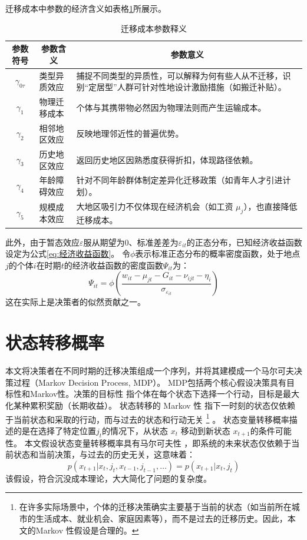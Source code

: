 \documentclass[
  a4paper,
  zihao=-4,
  fontset=mac,
  AutoFakeBold,
  AutoFakeSlant,
  oneside]{ctexbook}
\let\oldfootnote\footnote
\renewcommand{\footnote}[1]{%
  \oldfootnote{\setstretch{1.5}#1}%
}
\begin{document}
迁移成本中参数的经济含义如表格\ref{tab:迁移成本参数释义}所展示。
\begin{table}[!ht]
  \centering
  \caption{迁移成本参数释义}
  \label{tab:迁移成本参数释义}
  \begin{tabularx}{\textwidth}{@{}llX@{}}
    \toprule
    \multicolumn{1}{c}{\textbf{参数符号}} & \multicolumn{1}{c}{\textbf{参数含义}} & \multicolumn{1}{c}{\textbf{参数意义}} \\ \midrule
    \multicolumn{1}{c}{$\gamma_{0\tau}$} & 类型异质效应 & 捕捉不同类型的异质性，可以解释为何有些人从不迁移，识别“定居型”人群可针对性地设计激励措施（如搬迁补贴）。\\ 
    \multicolumn{1}{c}{$\gamma_1$} & 物理迁移成本 & 个体与其携带物必然因为物理法则而产生运输成本。 \\ 
    \multicolumn{1}{c}{$\gamma_2$} & 相邻地区效应 & 反映地理邻近性的普遍优势。 \\ 
    \multicolumn{1}{c}{$\gamma_3$} & 历史地区效应 & 返回历史地区因熟悉度获得折扣，体现路径依赖。 \\ 
    \multicolumn{1}{c}{$\gamma_4$} & 年龄障碍效应 & 针对不同年龄群体制定差异化迁移政策（如青年人才引进计划）。\\ 
    \multicolumn{1}{c}{$\gamma_5$} & 规模成本效应 & 大地区吸引力不仅体现在经济机会（如工资 $\mu_j$），也直接降低迁移成本。\\ \bottomrule
  \end{tabularx}
\end{table}


此外，由于暂态效应$\varepsilon$服从期望为0、标准差差为\(\varepsilon_{it}\)的正态分布，已知经济收益函数设定为公式\ref{eq:经济收益函数}。
令$\phi$表示标准正态分布的概率密度函数，处于地点$j$的个体$i$在时期$t$的经济收益函数的密度函数$\Psi_{it}$为：
\begin{equation}
  \Psi_{it}=\phi(\frac{w_{it} - \mu_{jt} - G_{it} - \nu_{ijt} - \eta_i }{\sigma_{\varepsilon_{it}}})
  \label{eq:经济收益似然贡献}
\end{equation}
这在实际上是决策者的似然贡献之一。

\section{状态转移概率}

本文将决策者在不同时期的迁移决策组成一个序列，并将其建模成一个马尔可夫决策过程（Markov Decision Process, MDP）。
MDP包括两个核心假设决策具有目标性和Markov性。决策的目标性 指个体在每个状态下选择一个行动，目标是最大化某种累积奖励（长期收益）。
状态转移的 Markov 性 指下一时刻的状态仅依赖于当前状态和采取的行动，而与过去的状态和行动无关
\footnote{在许多实际场景中，个体的迁移决策确实主要基于当前的状态（如当前所在城市的生活成本、就业机会、家庭因素等），而不是过去的迁移历史。因此，本文的Markov 性假设是合理的。}。
状态变量转移概率描述的是在选择了特定位置$j_{t}$的情况下，从状态 $x_t$ 移动到新状态 $x_{t+1}$的条件可能性。
本文假设状态变量转移概率具有马尔可夫性
，即系统的未来状态仅依赖于当前状态和当前决策，与过去的历史无关，这意味着：
\begin{equation}
  p(x_{t+1}|x_{t},j_{t},x_{t-1},j_{t-1},\ldots)=p(x_{t+1}|x_{t},j_{t})
\end{equation}
该假设，符合沉没成本理论，大大简化了问题的复杂度。
\end{document}
